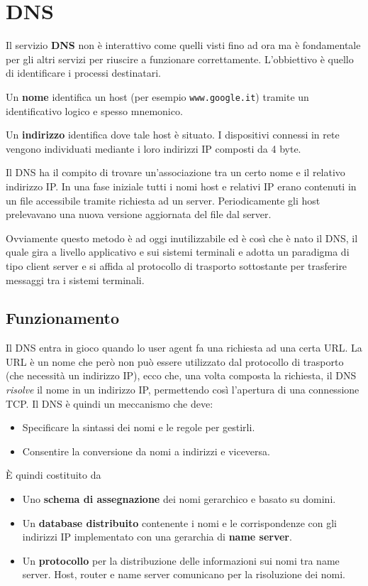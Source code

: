 \section{DNS}
Il servizio \textbf{DNS} non è interattivo come quelli visti fino ad
ora ma è fondamentale per gli altri servizi per riuscire a funzionare 
correttamente. L'obbiettivo è quello di identificare i processi
destinatari.

Un \textbf{nome} identifica un host (per esempio \verb|www.google.it|) 
tramite un identificativo logico e spesso mnemonico.

Un \textbf{indirizzo} identifica dove tale host è situato. I 
dispositivi connessi in rete vengono individuati mediante i loro 
indirizzi IP composti da 4 byte.

Il DNS ha il compito di trovare un'associazione tra un certo nome e il 
relativo indirizzo IP. In una fase iniziale tutti i nomi host e 
relativi IP erano contenuti in un file accessibile tramite richiesta ad
un server. Periodicamente gli host prelevavano una nuova versione 
aggiornata del file dal server.

Ovviamente questo metodo è ad oggi inutilizzabile ed è così che è nato 
il DNS, il quale gira a livello applicativo e sui sistemi terminali e
adotta un paradigma di tipo client server e si affida al protocollo di 
trasporto sottostante per trasferire messaggi tra i sistemi terminali.

\subsection{Funzionamento}
Il DNS entra in gioco quando lo user agent fa una richiesta ad una 
certa URL. La URL è un nome che però non può essere utilizzato dal 
protocollo di trasporto (che necessità un indirizzo IP), ecco che, una
volta composta la richiesta, il DNS \emph{risolve} il nome in un 
indirizzo IP, permettendo così l'apertura di una connessione TCP. Il
DNS è quindi un meccanismo che deve:
\begin{itemize}
	\item Specificare la sintassi dei nomi e le regole per gestirli.
	\item Consentire la conversione da nomi a indirizzi e viceversa.
\end{itemize}
\`E quindi costituito da
\begin{itemize}
	\item Uno \textbf{schema di assegnazione} dei nomi gerarchico e 
		basato su domini.
	\item Un \textbf{database distribuito} contenente i nomi e le 
		corrispondenze con gli indirizzi IP implementato con una 
		gerarchia di \textbf{name server}.
	\item Un \textbf{protocollo} per la distribuzione delle 
		informazioni sui nomi tra name server. Host, router e name 
		server comunicano per la risoluzione dei nomi.
\end{itemize}

